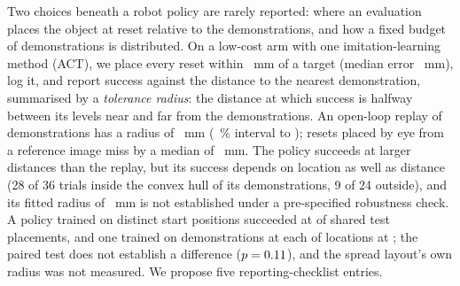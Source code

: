 Two choices beneath a robot policy are rarely reported: where an evaluation places the object at reset relative to the demonstrations, and how a fixed budget of demonstrations is distributed.
On a low-cost arm with one imitation-learning method (ACT), we place every reset within \placementTolerance~mm of a target (median error \resetErrorMedian~mm), log it, and report success against the distance to the nearest demonstration, summarised by a \emph{tolerance radius}: the distance at which success is halfway between its levels near and far from the demonstrations.
An open-loop replay of demonstrations has a radius of \radiusReplay~mm (\intervalLevel~\% interval \radiusReplayLow to \radiusReplayHigh); resets placed by eye from a reference image miss by a median of \byEyeErrorMedian~mm.
The policy succeeds at larger distances than the replay, but its success depends on location as well as distance (28 of 36 trials inside the convex hull of its demonstrations, 9 of 24 outside), and its fitted radius of \radiusClusteredThreshold~mm is not established under a pre-specified robustness check. %
A policy trained on \nPointsSpread distinct start positions succeeded at \workspaceSuccessSpread of \nPairs shared test placements, and one trained on \nDemosPerCell demonstrations at each of \nPointsClustered locations at \workspaceSuccessClustered; the paired test does not establish a difference ($p=0.11$), and the spread layout's own radius was not measured.
We propose five reporting-checklist entries.
